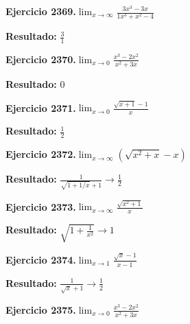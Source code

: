 \documentclass[10pt,a4paper]{article}
\begin{document}
\newpage
\begin{ejbox}
\textbf{Ejercicio 2369.}\quad $\lim_{x\to \infty} \frac{3x^3 - 3x}{1x^3 + x^2 - 4}$
\end{ejbox}

\begin{solbox}
\textbf{Resultado:} \(\displaystyle \frac{3}{1}\)
\end{solbox}

\begin{ejbox}
\textbf{Ejercicio 2370.}\quad $\lim_{x\to 0} \frac{x^3-2x^2}{x^2+3x}$
\end{ejbox}

\begin{solbox}
\textbf{Resultado:} \(\displaystyle 0\)
\end{solbox}

\begin{ejbox}
\textbf{Ejercicio 2371.}\quad $\lim_{x\to 0} \frac{\sqrt{x+1}-1}{x}$
\end{ejbox}

\begin{solbox}
\textbf{Resultado:} \(\displaystyle \frac{1}{2}\)
\end{solbox}

\newpage
\begin{ejbox}
\textbf{Ejercicio 2372.}\quad $\lim_{x\to \infty} (\sqrt{x^2+x} - x)$
\end{ejbox}

\begin{solbox}
\textbf{Resultado:} \(\displaystyle \frac{1}{\sqrt{1+1/x}+1} \to \frac{1}{2}\)
\end{solbox}

\begin{ejbox}
\textbf{Ejercicio 2373.}\quad $\lim_{x\to \infty} \frac{\sqrt{x^2+1}}{x}$
\end{ejbox}

\begin{solbox}
\textbf{Resultado:} \(\displaystyle \sqrt{1+\frac{1}{x^2}} \to 1\)
\end{solbox}

\begin{ejbox}
\textbf{Ejercicio 2374.}\quad $\lim_{x\to 1} \frac{\sqrt{x}-1}{x-1}$
\end{ejbox}

\begin{solbox}
\textbf{Resultado:} \(\displaystyle \frac{1}{\sqrt{x}+1} \to \frac{1}{2}\)
\end{solbox}

\newpage
\begin{ejbox}
\textbf{Ejercicio 2375.}\quad $\lim_{x\to 0} \frac{x^3-2x^2}{x^2+3x}$
\end{ejbox}
\end{document}
